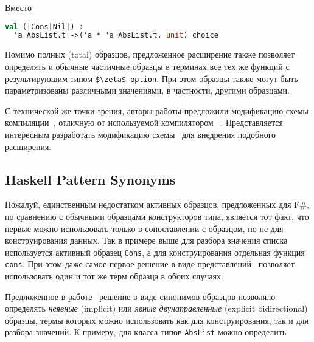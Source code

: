 Вместо

\noindent
\begin{minipage}{\linewidth}
\begin{lstlisting}[language=ocaml]
val (|Cons|Nil|) : 
  'a AbsList.t ->('a * 'a AbsList.t, unit) choice
\end{lstlisting}
\end{minipage}

Помимо полных (total) образцов, предложенное расширение также позволяет определять и обычные частичные образцы в терминах все тех же функций с результирующим типом \lstinline[breaklines]|$\zeta$ option|. При этом образцы также могут быть параметризованы различными значениями, в частности, другими образцами.

С технической же точки зрения, авторы работы предложили модификацию схемы компиляции~\cite{scott2000whendo}, отличную от используемой компилятором \ocaml~\cite{fessant2001optimizing}. Представляется интересным разработать модификацию схемы~\cite{fessant2001optimizing} для внедрения подобного расширения.

\subsection{Haskell Pattern Synonyms}
Пожалуй, единственным недостатком активных образцов, предложенных для F\#, по сравнению с обычными образцами конструкторов типа, является тот факт, что первые можно использовать только в сопоставлении с образцом, но не для конструирования данных. Так в примере выше для разбора значения списка используется активный образец \lstinline|Cons|, а для конструирования отдельная функция \lstinline|cons|. При этом даже самое первое решение в виде представлений~\cite{wadler1987views} позволяет использовать один и тот же терм образца в обоих случаях.

Предложенное в работе~\cite{pickering2016pattern} решение в виде синонимов образцов позволяло определять \textit{неявные} (implicit) или \textit{явные двунаправленные} (expli\-cit bidirectional) образцы, термы которых можно использовать как для конструирования, так и для разбора значений. К примеру, для класса типов \lstinline|AbsList| можно определить


